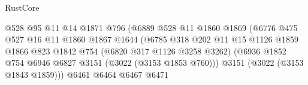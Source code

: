 \begin{lexlean}{RustCore}
\begin{coremodule}
                                                @528
                                                @95
                                                @11
                                                @14
                                                @1871
                                                @796
                                                (@6889
                                                  @528
                                                  @11
                                                  @1860
                                                  @1869
                                                  (@6776
                                                    @475
                                                    @527
                                                    @16
                                                    @11
                                                    @1860
                                                    @1867
                                                    @1644
                                                    (@6785
                                                      @318
                                                      @202
                                                      @11
                                                      @15
                                                      @1126
                                                      @1859
                                                      @1866
                                                      @823
                                                      @1842
                                                      @754
                                                      (@6820 @317 @1126 @3258 @3262)
                                                      (@6936
                                                        @1852
                                                        @754
                                                        @6946
                                                        @6827
                                                        @3151
                                                        (@3022 (@3153 @1853 @760)))
                                                      @3151
                                                      (@3022 (@3153 @1843 @1859)))
                                                    @6461
                                                    @6464
                                                    @6467
                                                    @6471

\end{coremodule}
\end{lexlean}
